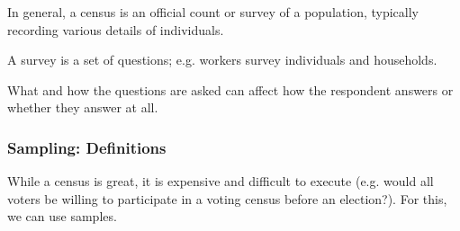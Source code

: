 \begin{definition}[Census]{In general, a census is an official count or survey of a population, typically recording various details of individuals.
}
\end{definition}

\begin{definition}[Survey]{A survey is a set of questions; e.g. workers survey individuals and households.

What and how the questions are asked can affect how the respondent answers or whether they answer at all.
}
\end{definition}

\subsubsection{Sampling: Definitions}
While a census is great, it is expensive and difficult to execute (e.g. would all voters be willing to participate in a voting census before an election?). For this, we can use samples.

